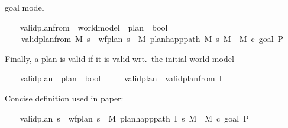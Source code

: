 \begin{isabellebody}
\begin{isamarkuptext}
    goal model%
\end{isamarkuptext}\isamarkuptrue%
\ \ \isamarkupfalse%
\ valid{\isacharunderscore}{\kern0pt}plan{\isacharunderscore}{\kern0pt}from{}\ {\isacharcolon}{\kern0pt}{\isacharcolon}{\kern0pt}\ {\isachardoublequoteopen}world{\isacharunderscore}{\kern0pt}model\ {\isasymRightarrow}\ plan\ {\isasymRightarrow}\ bool{\isachardoublequoteclose}\ \isanewline
\ \ \ \ {\isachardoublequoteopen}valid{\isacharunderscore}{\kern0pt}plan{\isacharunderscore}{\kern0pt}from{}\ M\ {\isasympi}s\ {\isasymlongleftrightarrow}\ {\isacharparenleft}{\kern0pt}wf{\isacharunderscore}{\kern0pt}plan\ {\isasympi}s\ {\isasymand}\ {\isacharparenleft}{\kern0pt}{\isasymexists}M{\isacharprime}{\kern0pt}{\isachardot}{\kern0pt}\ plan{\isacharunderscore}{\kern0pt}happ{\isacharunderscore}{\kern0pt}path\ M\ {\isasympi}s\ M{\isacharprime}{\kern0pt}\ {\isasymand}\ M{\isacharprime}{\kern0pt}\ \isactrlsup c{\isasymTTurnstile}\isactrlsub {\isacharequal}{\kern0pt}\ {\isacharparenleft}{\kern0pt}goal\ P{\isacharparenright}{\kern0pt}{\isacharparenright}{\kern0pt}{\isacharparenright}{\kern0pt}{\isachardoublequoteclose}%
\begin{isamarkuptext}%
Finally, a plan is valid if it is valid wrt.\ the initial world
    model %
\end{isamarkuptext}\isamarkuptrue%
\ \ \isamarkupfalse%
\ valid{\isacharunderscore}{\kern0pt}plan{}\ {\isacharcolon}{\kern0pt}{\isacharcolon}{\kern0pt}\ {\isachardoublequoteopen}plan\ {\isasymRightarrow}\ bool{\isachardoublequoteclose}\isanewline
\ \ \ \ \ {\isachardoublequoteopen}valid{\isacharunderscore}{\kern0pt}plan{}\ {\isasymequiv}\ valid{\isacharunderscore}{\kern0pt}plan{\isacharunderscore}{\kern0pt}from{}\ I{\isachardoublequoteclose}%
\begin{isamarkuptext}%
Concise definition used in paper:%
\end{isamarkuptext}\isamarkuptrue%
\ \ \isamarkupfalse%
\ {\isachardoublequoteopen}valid{\isacharunderscore}{\kern0pt}plan{}\ {\isasympi}s\ {\isasymequiv}\ wf{\isacharunderscore}{\kern0pt}plan\ {\isasympi}s\ {\isasymand}\ {\isacharparenleft}{\kern0pt}{\isasymexists}M{\isacharprime}{\kern0pt}{\isachardot}{\kern0pt}\ plan{\isacharunderscore}{\kern0pt}happ{\isacharunderscore}{\kern0pt}path\ I\ {\isasympi}s\ M{\isacharprime}{\kern0pt}\ {\isasymand}\ M{\isacharprime}{\kern0pt}\ \isactrlsup c{\isasymTTurnstile}\isactrlsub {\isacharequal}{\kern0pt}\ {\isacharparenleft}{\kern0pt}goal\ P{\isacharparenright}{\kern0pt}{\isacharparenright}{\kern0pt}{\isachardoublequoteclose}\isanewline

\end{isabellebody}
